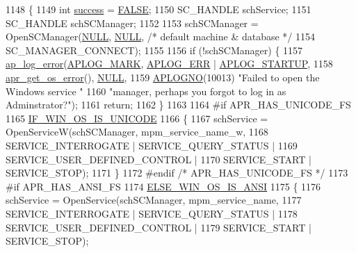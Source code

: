 \begin{DoxyCode}
1148 \{
1149     \textcolor{keywordtype}{int} \hyperlink{pcre_8txt_a3dcbbd19234731174dbb726c1c0f4f06}{success} = \hyperlink{group__MOD__SSL__PRIVATE_gaa93f0eb578d23995850d61f7d61c55c1}{FALSE};
1150     SC\_HANDLE   schService;
1151     SC\_HANDLE   schSCManager;
1152 
1153     schSCManager = OpenSCManager(\hyperlink{pcre_8txt_ad7f989d16aa8ca809a36bc392c07fba1}{NULL}, \hyperlink{pcre_8txt_ad7f989d16aa8ca809a36bc392c07fba1}{NULL}, \textcolor{comment}{/* default machine & database */}
1154                                  SC\_MANAGER\_CONNECT);
1155 
1156     \textcolor{keywordflow}{if} (!schSCManager) \{
1157         \hyperlink{group__APACHE__CORE__LOG_ga5e6676c87418af7a1d323a116c78ecb4}{ap\_log\_error}(\hyperlink{group__APACHE__CORE__LOG_ga655e126996849bcb82e4e5a14c616f4a}{APLOG\_MARK}, \hyperlink{group__APACHE__CORE__LOG_ga57ad94ed8c92c4306de90479251a5d58}{APLOG\_ERR} | 
      \hyperlink{group__APACHE__CORE__LOG_ga39efd19b052fb6f39d8f263c16cc82b7}{APLOG\_STARTUP},
1158                      \hyperlink{group__apr__errno_gaa76e122da00af0ce2e8c8d7ff538bdfa}{apr\_get\_os\_error}(), \hyperlink{pcre_8txt_ad7f989d16aa8ca809a36bc392c07fba1}{NULL},
1159                      \hyperlink{group__APACHE__CORE__LOG_ga1dee8a07e06bc5b3de8b89662c2cd666}{APLOGNO}(10013)  \textcolor{stringliteral}{"Failed to open the Windows service "}
1160                      \textcolor{stringliteral}{"manager, perhaps you forgot to log in as Adminstrator?"});
1161         \textcolor{keywordflow}{return};
1162     \}
1163 
1164 \textcolor{preprocessor}{#if APR\_HAS\_UNICODE\_FS}
1165     \hyperlink{win32_2apr__arch__misc_8h_a8c631486790f65bd87ed0623a25bdd3d}{IF\_WIN\_OS\_IS\_UNICODE}
1166     \{
1167         schService = OpenServiceW(schSCManager, mpm\_service\_name\_w,
1168                                   SERVICE\_INTERROGATE | SERVICE\_QUERY\_STATUS |
1169                                   SERVICE\_USER\_DEFINED\_CONTROL |
1170                                   SERVICE\_START | SERVICE\_STOP);
1171     \}
1172 \textcolor{preprocessor}{#endif }\textcolor{comment}{/* APR\_HAS\_UNICODE\_FS */}\textcolor{preprocessor}{}
1173 \textcolor{preprocessor}{#if APR\_HAS\_ANSI\_FS}
1174     \hyperlink{win32_2apr__arch__misc_8h_a2d1423da7a6a46da1276017c8140be22}{ELSE\_WIN\_OS\_IS\_ANSI}
1175     \{
1176         schService = OpenService(schSCManager, mpm\_service\_name,
1177                                  SERVICE\_INTERROGATE | SERVICE\_QUERY\_STATUS |
1178                                  SERVICE\_USER\_DEFINED\_CONTROL |
1179                                  SERVICE\_START | SERVICE\_STOP);

\end{DoxyCode}
